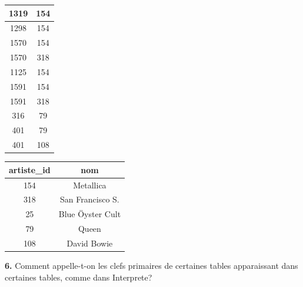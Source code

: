 \documentclass[article,a4paper,firamath,12pt]{nsi}
\begin{document}
\begin{center}
\begin{tabular}{|c|c|}
        \hline
        1319                                                  & \color{white}154                  \\
        \hline
        1298                                                  & 154                               \\
        \hline
        1570                                                  & 154                               \\
        \hline
        1570                                                  & 318                               \\
        \hline
        1125                                                  & 154                               \\
        \hline
        1591                                                  & 154                               \\
        \hline
        1591                                                  & 318                               \\
        \hline
        316                                                   & 79                                \\
        \hline
        401                                                   & 79                                \\
        \hline
        401                                                   & 108                               \\
        \hline
    \end{tabular}	\hspace*{1em}
    \begin{tabular}{|c|c|}
        \hline
        \rowcolor{UGLiOrange} \color{white}\textbf{artiste\_id} & \color{white}\textbf{nom}     \\
        \hline
        \color{white} 154                                       & Metallica                     \\
        \hline
        318                                                     & \color{white}San Francisco S. \\
        \hline
        25                                                      & \color{white}Blue Öyster Cult \\
        \hline
        79                                                      & \color{white} Queen           \\
        \hline
        108                                                     & \color{white} David Bowie     \\
        \hline
    \end{tabular}
\end{center}
\textbf{6.} Comment appelle-t-on les clefs primaires de certaines tables apparaissant dans certaines tables, comme dans Interprete?\\
\end{document}
